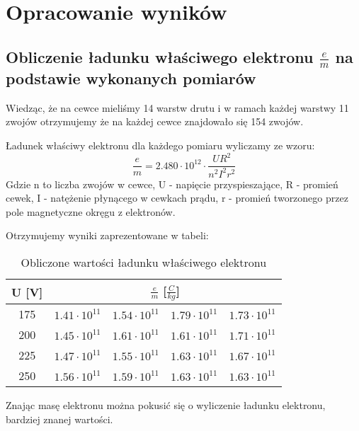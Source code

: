\documentclass{article}
\begin{document}

\section{Opracowanie wyników}
\subsection{Obliczenie ładunku właściwego elektronu $\frac{e}{m}$ na podstawie wykonanych pomiarów}

Wiedząc, że na cewce mieliśmy 14 warstw drutu i w ramach każdej warstwy 11 zwojów otrzymujemy że na każdej cewce znajdowało się 154 zwojów.

Ładunek właściwy elektronu dla każdego pomiaru wyliczamy ze wzoru:
\begin{equation}
	\frac{e}{m} = 2.480 \cdot 10^{12} \cdot \frac{UR^2}{n^2I^2r^2}
\end{equation}
Gdzie n to liczba zwojów w cewce, U - napięcie przyspieszające, R - promień cewek, I - natężenie płynącego w cewkach prądu, r - promień tworzonego przez pole magnetyczne okręgu z elektronów.

\clearpage

Otrzymujemy wyniki zaprezentowane w tabeli:
\begin{table}[htbp]
\centering
\begin{tabular}{|c|r|r|r|r|}
\hline
U [V] & \multicolumn{4}{|c|}{$\frac{e}{m}$ [$\frac{C}{kg}$]} \\ \hline
175 & $1.41 \cdot 10^{11}$ & $1.54 \cdot 10^{11}$ & $1.79 \cdot 10^{11}$ & $1.73 \cdot 10^{11}$ \\ \hline
200 & $1.45 \cdot 10^{11}$ & $1.61 \cdot 10^{11}$ & $1.61 \cdot 10^{11}$ & $1.71 \cdot 10^{11}$ \\ \hline
225 & $1.47 \cdot 10^{11}$ & $1.55 \cdot 10^{11}$ & $1.63 \cdot 10^{11}$ & $1.67 \cdot 10^{11}$ \\ \hline
250 & $1.56 \cdot 10^{11}$ & $1.59 \cdot 10^{11}$ & $1.63 \cdot 10^{11}$ & $1.63 \cdot 10^{11}$ \\ \hline
\end{tabular}
\caption{Obliczone wartości ładunku właściwego elektronu}
\label{}
\end{table}

Znając masę elektronu można pokusić się o wyliczenie ładunku elektronu, bardziej znanej wartości.
\end{document}
